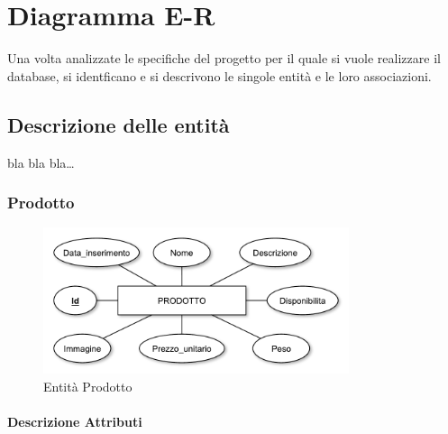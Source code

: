 
\chapter{Diagramma E-R}
\label{cap:diagramma}

Una volta analizzate le specifiche del progetto per il quale si vuole realizzare il database, si identficano e si descrivono le singole entità e le loro associazioni.

\section{Descrizione delle entità}
bla bla bla\dots{}

	\subsection{Prodotto}\label{e-prodotto}
	
	\begin{figure}[h]
		\centering
		\includegraphics[width=0.8\textwidth]
		{immagini/01_prodotto}
		
		\caption{Entità Prodotto}
	\end{figure}	
	
	\subsubsection*{Descrizione Attributi}
	
